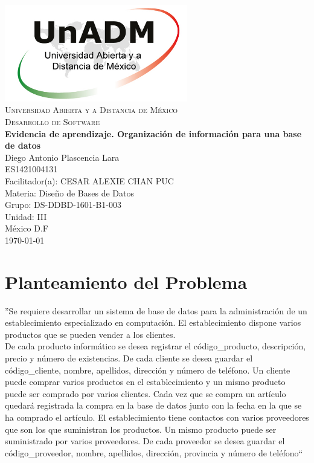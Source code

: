\documentclass[spanish,12pt,letterpapper]{article}
\begin{document}
	\begin{titlepage}
		\begin{center}
			\includegraphics[width=0.6\textwidth]{../logoUnADM}~\\[1cm] 
			\textsc{Universidad Abierta y a Distancia de México}\\[0.8cm]
			\textsc{Desarrollo de Software}\\[1.8cm]
			
			\textbf{ \Large Evidencia de aprendizaje. Organización de información para una base de datos }\\[3cm]
			
			Diego Antonio Plascencia Lara\\ ES1421004131 \\[0.4cm]
			Facilitador(a): CESAR ALEXIE CHAN PUC  \\
			Materia: Diseño de Bases de Datos\\
			Grupo: DS-DDBD-1601-B1-003 \\
			Unidad: III \\
			
			\vfill México D.F\\{\today}
			
		\end{center}
	\end{titlepage}
	
	\section{Planteamiento del Problema}	
	''Se requiere desarrollar un sistema de base de datos para la administración de un establecimiento especializado en computación. El establecimiento dispone varios productos que se pueden vender a los clientes.\\

De cada producto informático se desea registrar  el código\_producto, descripción, precio y número de existencias. De cada cliente se desea guardar el código\_cliente, nombre, apellidos, dirección y número de teléfono. Un cliente puede comprar varios productos en el establecimiento y un mismo producto puede ser comprado por varios clientes. Cada vez que se compra un artículo quedará registrada la compra en la base de datos junto con la fecha en la que se ha comprado el artículo. El establecimiento tiene contactos con varios proveedores que son los que suministran los productos. Un mismo producto puede ser suministrado por varios proveedores. De cada proveedor se desea guardar el código\_proveedor, nombre, apellidos, dirección, provincia y número de teléfono``\\
	
\end{document}
